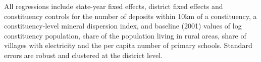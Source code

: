 All regressions include state-year fixed effects, district fixed
effects and constituency controls for the number of deposits within
10km of a constituency, a constituency-level mineral dispersion index,
and baseline (2001) values of log constituency population, share of
the population living in rural areas, share of villages with
electricity and the per capita number of primary schools.  Standard
errors are robust and clustered at the district level.%
